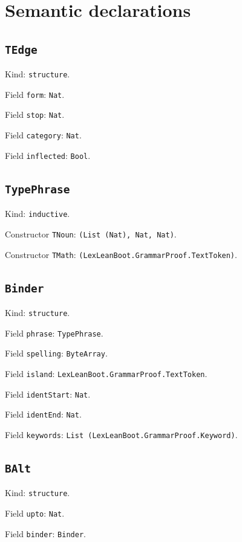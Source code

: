 \documentclass[11pt]{article}
\begin{document}
\section*{Semantic declarations}
\subsection*{\texttt{TEdge}}
\noindent Kind: \texttt{structure}.\par
\noindent Field \texttt{form}: \texttt{Nat}.\par
\noindent Field \texttt{stop}: \texttt{Nat}.\par
\noindent Field \texttt{category}: \texttt{Nat}.\par
\noindent Field \texttt{inflected}: \texttt{Bool}.\par
\subsection*{\texttt{TypePhrase}}
\noindent Kind: \texttt{inductive}.\par
\noindent Constructor \texttt{TNoun}: \texttt{(List (Nat), Nat, Nat)}.\par
\noindent Constructor \texttt{TMath}: \texttt{(LexLeanBoot.GrammarProof.TextToken)}.\par
\subsection*{\texttt{Binder}}
\noindent Kind: \texttt{structure}.\par
\noindent Field \texttt{phrase}: \texttt{TypePhrase}.\par
\noindent Field \texttt{spelling}: \texttt{ByteArray}.\par
\noindent Field \texttt{island}: \texttt{LexLeanBoot.GrammarProof.TextToken}.\par
\noindent Field \texttt{identStart}: \texttt{Nat}.\par
\noindent Field \texttt{identEnd}: \texttt{Nat}.\par
\noindent Field \texttt{keywords}: \texttt{List (LexLeanBoot.GrammarProof.Keyword)}.\par
\subsection*{\texttt{BAlt}}
\noindent Kind: \texttt{structure}.\par
\noindent Field \texttt{upto}: \texttt{Nat}.\par
\noindent Field \texttt{binder}: \texttt{Binder}.\par
\end{document}
